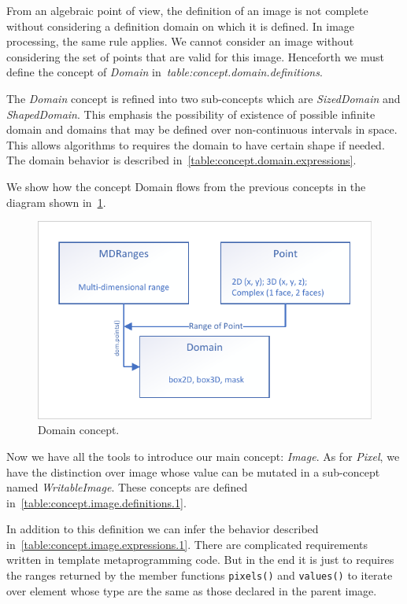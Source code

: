 From an algebraic point of view, the definition of an image is not complete without considering a definition domain on
which it is defined. In image processing, the same rule applies. We cannot consider an image without considering the set
of points that are valid for this image. Henceforth we must define the concept of \emph{Domain}
in~\emph{table:concept.domain.definitions}.

The \emph{Domain} concept is refined into two sub-concepts which are \emph{SizedDomain} and \emph{ShapedDomain}. This
emphasis the possibility of existence of possible infinite domain and domains that may be defined over non-continuous
intervals in space. This allows algorithms to requires the domain to have certain shape if needed. The domain behavior
is described in~\cref{table:concept.domain.expressions}.

We show how the concept Domain flows from the previous concepts in the diagram shown in~\cref{fig:concept.domain}.

\begin{figure}[tbh]
  \centering
  \includegraphics[width=.8\linewidth]{figs/concepts/domain.pdf}
  \caption{Domain concept.}
  \label{fig:concept.domain}
\end{figure}

Now we have all the tools to introduce our main concept: \emph{Image}. As for \emph{Pixel}, we have the distinction over
image whose value can be mutated in a sub-concept named \emph{WritableImage}. These concepts are defined
in~\cref{table:concept.image.definitions.1}.

In addition to this definition we can infer the behavior described in~\cref{table:concept.image.expressions.1}. There
are complicated requirements written in template metaprogramming code. But in the end it is just to requires the ranges
returned by the member functions \texttt{pixels()} and \texttt{values()} to iterate over element whose type are the same
as those declared in the parent image.

